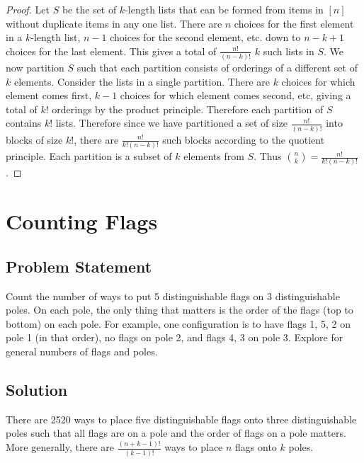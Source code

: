 \documentclass[12pt]{article}
\begin{document}
\begin{proof}
Let $S$ be the set of $k$-length lists that can be formed from items in $[n]$ without duplicate items in any one list. There are $n$ choices for the first element in a $k$-length list, $n-1$ choices for the second element, etc. down to $n -k + 1$ choices for the last element. This gives a total of $\frac{n!}{(n-k)!}$ $k$ such lists in $S$. We now partition $S$ such that each partition consists of orderings of a different set of $k$ elements. Consider the lists in a single partition. There are $k$ choices for which element comes first, $k-1$ choices for which element comes second, etc, giving a total of $k!$ orderings by the product principle. Therefore each partition of $S$ contains $k!$ lists. Therefore since we have partitioned a set of size $\frac{n!}{(n-k)!}$ into blocks of size $k!$, there are $\frac{n!}{k!(n-k)!}$ such blocks according to the quotient principle. Each partition is a subset of $k$ elements from $S$. Thus $\binom{n}{k} = \frac{n!}{k!(n-k)!}$.
\end{proof}

\section{Counting Flags}
\subsection*{Problem Statement}
Count the number of ways to put 5 distinguishable flags on 3 distinguishable poles. On each pole, the only thing that matters is the order of the flags (top to bottom) on each pole. For example, one configuration is to have flags 1, 5, 2 on pole 1 (in that order), no flags on pole 2, and flags 4, 3 on pole 3. Explore for general numbers of flags and poles.
\subsection*{Solution}

There are 2520 ways to place five distinguishable flags onto three distinguishable poles such that all flags are on a pole and the order of flags on a pole matters. More generally, there are $\frac{(n+k-1)!}{(k-1)!}$ ways to place $n$ flags onto $k$ poles.
\end{document}
